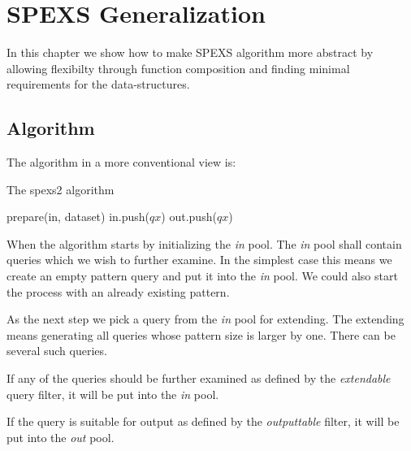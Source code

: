 \chapter{SPEXS Generalization}
\label{c:generalization}

\WIP

In this chapter we show how to make SPEXS algorithm more abstract by allowing flexibilty through function composition and finding minimal requirements for the data-structures.

\section{Algorithm}

The algorithm in a more conventional view is:

\begin{algorithm}[H]
	\caption{The spexs2 algorithm}
\begin{algorithmic}[1]
	\Statex
		\State prepare(in, dataset)
					\State in.push($qx$)
				\EndIf
					\State out.push($qx$)
				\EndIf
			\EndFor
		\EndWhile
	\EndFunction
\end{algorithmic}
\end{algorithm}

When the algorithm starts by initializing the \emph{in} pool. The \emph{in} pool shall contain queries which we wish to further examine. In the simplest case this means we create an empty pattern query and put it into the \emph{in} pool. We could also start the process with an already existing pattern.

As the next step we pick a query from the \emph{in} pool for extending. The extending means generating all queries whose pattern size is larger by one. There can be several such queries.

If any of the queries should be further examined as defined by the \emph{extendable} query filter, it will be put into the \emph{in} pool.

If the query is suitable for output as defined by the \emph{outputtable} filter, it will be put into the \emph{out} pool. 

